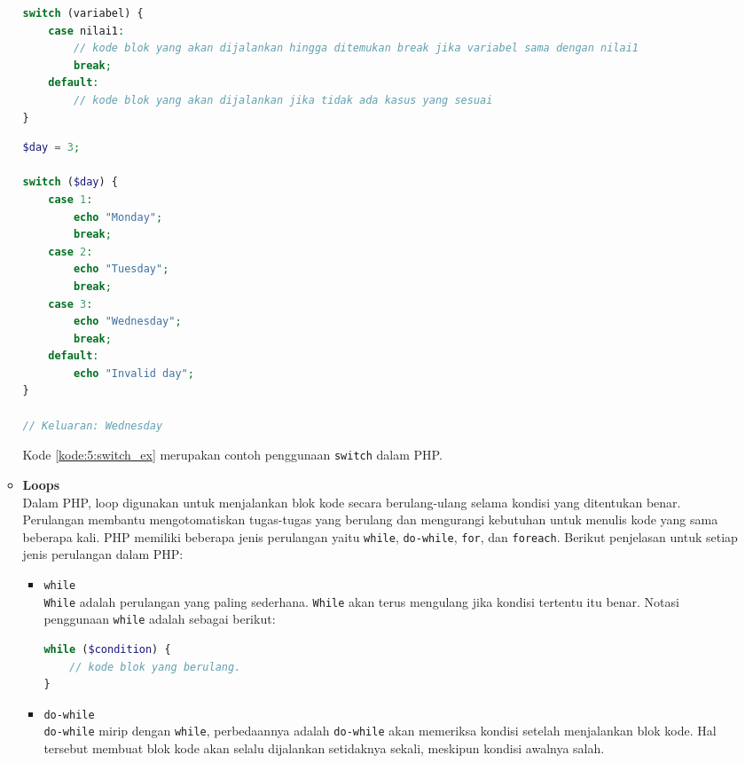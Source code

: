 \documentclass[a4paper,twoside]{article}
\begin{document}
\begin{enumerate}
\begin{itemize}
		            \begin{lstlisting}[language={php}, caption={Notasi switch}, label={kode:5:switch_notasi}]
switch (variabel) {
	case nilai1:
		// kode blok yang akan dijalankan hingga ditemukan break jika variabel sama dengan nilai1
		break;
	default:
		// kode blok yang akan dijalankan jika tidak ada kasus yang sesuai
}
					\end{lstlisting}

		            \begin{lstlisting}[language={php}, caption={Contoh Penggunaan switch}, label={kode:5:switch_ex}]
$day = 3;

switch ($day) {
	case 1:
		echo "Monday";
		break;
	case 2:
		echo "Tuesday";
		break;
	case 3:
		echo "Wednesday";
		break;
	default:
		echo "Invalid day";
}

// Keluaran: Wednesday 
					\end{lstlisting}

		            Kode \ref{kode:5:switch_ex} merupakan contoh penggunaan \verb|switch| dalam PHP.

		      \item \textbf{Loops} \\
		            Dalam PHP, loop digunakan untuk menjalankan blok kode secara berulang-ulang selama kondisi yang ditentukan benar. Perulangan membantu mengotomatiskan tugas-tugas yang berulang dan mengurangi kebutuhan untuk menulis kode yang sama beberapa kali. PHP memiliki beberapa jenis perulangan yaitu \verb|while|, \verb|do-while|, \verb|for|, dan \verb|foreach|. Berikut penjelasan untuk setiap jenis perulangan dalam PHP:

		            \begin{itemize}
			            \item \verb|while| \\
			                  \verb|While| adalah perulangan yang paling sederhana. \verb|While| akan terus mengulang jika kondisi tertentu itu benar. Notasi penggunaan \verb|while| adalah sebagai berikut:

			                  \begin{lstlisting}[language={php}, caption={Notasi while}, label={kode:5:while_notasi}]
while ($condition) {
	// kode blok yang berulang.
}
							  \end{lstlisting}

			            \item \verb|do-while| \\
			                  \verb|do-while| mirip dengan \verb|while|, perbedaannya adalah \verb|do-while| akan memeriksa kondisi setelah menjalankan blok kode. Hal tersebut membuat blok kode akan selalu dijalankan setidaknya sekali, meskipun kondisi awalnya salah.


\end{itemize}
\end{itemize}
\end{enumerate}
\end{document}
